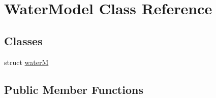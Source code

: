 \hypertarget{classWaterModel}{
\section{WaterModel Class Reference}
\label{classWaterModel}
}
\subsection*{Classes}
\begin{DoxyCompactItemize}
\item 
struct \hyperlink{structWaterModel_1_1waterM}{waterM}
\end{DoxyCompactItemize}
\subsection*{Public Member Functions}
